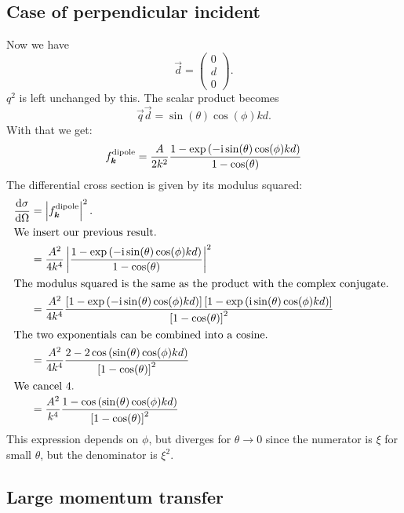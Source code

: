 \documentclass[11pt, english, fleqn, DIV=15, headinclude, BCOR=1.5cm]{scrartcl}
\begin{document}
\subsection{Case of perpendicular incident}

Now we have
\[
    \vec d =
    \begin{pmatrix}
        0 \\ d \\ 0
    \end{pmatrix}.
\]
$q^2$ is left unchanged by this. The scalar product becomes
\[
    \vec q \vec d = \sin(\theta) \cos(\phi) kd.
\]
With that we get:
\[
    f_{\boldsymbol{k}}^\text{dipole} = \frac{A}{2k^2} \frac{1 - \exp\left( -\mathrm i \sin(\theta)
    \cos(\phi) kd \right)}{1 - \cos(\theta)}
\]
The differential cross section is given by its modulus squared:
\begin{align*}
    \od\sigma\Omega
    &= \abs{f_{\vec k}^\text{dipole}}^2. \\
    \intertext{%
        We insert our previous result.
    }
    &= \frac{A^2}{4k^4} \abs{\frac{1 - \exp\del{-\iup \sin(\theta) \cos(\phi)
    kd}}{1 - \cos(\theta)}}^2 \\
    \intertext{%
        The modulus squared is the same as the product with the complex
        conjugate.
    }
    &= \frac{A^2}{4k^4} \frac{\sbr{1 - \exp\del{-\iup \sin(\theta) \cos(\phi)
    kd}}\sbr{1 - \exp\del{\iup \sin(\theta) \cos(\phi)
    kd}}}{\sbr{1 - \cos(\theta)}^2} \\
    \intertext{%
        The  two exponentials can be combined into a cosine.
    }
    &= \frac{A^2}{4k^4} \frac{2 - 2 \cos\del{\sin(\theta) \cos(\phi)
    kd}}{\sbr{1 - \cos(\theta)}^2} \\
    \intertext{%
        We cancel 4.
    }
    &= \frac{A^2}{k^4} \frac{1 - \cos\del{\sin(\theta) \cos(\phi)
    kd}}{\sbr{1 - \cos(\theta)}^2}
\end{align*}
This expression depends on $\phi$, but diverges for $\theta \to 0$ since the
numerator is $\xi$ for small $\theta$, but the denominator is $\xi^2$.

\subsection{Large momentum transfer}
\end{document}

